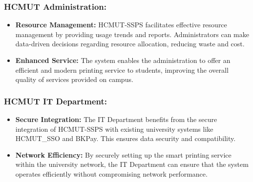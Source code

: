 \subsubsection{HCMUT Administration:}
\begin{itemize}
\item \textbf{Resource Management:} HCMUT-SSPS facilitates effective resource management by providing usage trends and reports. Administrators can make data-driven decisions regarding resource allocation, reducing waste and cost.
\item \textbf{Enhanced Service:} The system enables the administration to offer an efficient and modern printing service to students, improving the overall quality of services provided on campus.
\end{itemize}
\subsubsection{HCMUT IT Department:}
\begin{itemize}
\item \textbf{Secure Integration:} The IT Department benefits from the secure integration of HCMUT-SSPS with existing university systems like HCMUT\_SSO and BKPay. This ensures data security and compatibility.
\item \textbf{Network Efficiency:} By securely setting up the smart printing service within the university network, the IT Department can ensure that the system operates efficiently without compromising network performance.
\end{itemize}
